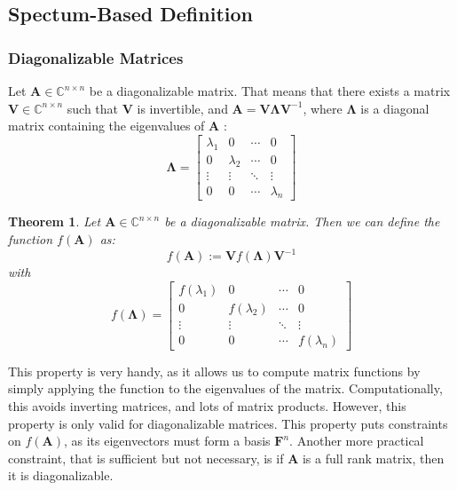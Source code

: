 \documentclass[12pt]{article}
\newtheorem{theorem}{Theorem}
\begin{document}
\subsection{Spectum-Based Definition}
\subsubsection*{Diagonalizable Matrices}
Let $\mathbf{A}\in\mathbb{C}^{n\times n}$ be a diagonalizable matrix. That means that there exists a matrix $\mathbf{V}\in\mathbb{C}^{n\times n}$ such that $\mathbf{V}$ is invertible, and $\mathbf{A} = \mathbf{V}\mathbf{\Lambda}\mathbf{V}^{-1}$, where $\mathbf{\Lambda}$ is a diagonal matrix containing the eigenvalues of $\mathbf{A}$ :
\begin{equation}
    \mathbf{\Lambda} = \begin{bmatrix}
        \lambda_1 & 0 & \cdots & 0 \\
        0 & \lambda_2 & \cdots & 0 \\
        \vdots & \vdots & \ddots & \vdots \\
        0 & 0 & \cdots & \lambda_n
    \end{bmatrix}
\end{equation}
\begin{theorem}
    Let $\mathbf{A}\in\mathbb{C}^{n\times n}$ be a diagonalizable matrix. Then we can define the function $f(\mathbf{A})$ as:
    \begin{equation}
        f(\mathbf{A}) := \mathbf{V}f(\mathbf{\Lambda})\mathbf{V}^{-1}
    \end{equation}
    with 
    \begin{equation}
        f(\mathbf{\Lambda}) = \begin{bmatrix}
            f(\lambda_1) & 0 & \cdots & 0 \\
            0 & f(\lambda_2) & \cdots & 0 \\
            \vdots & \vdots & \ddots & \vdots \\
            0 & 0 & \cdots & f(\lambda_n)
        \end{bmatrix}
    \end{equation}        
\end{theorem}
This property is very handy, as it allows us to compute matrix functions by simply applying the function to the eigenvalues of the matrix. Computationally, this avoids inverting matrices, and lots of matrix products. However, this property is only valid for diagonalizable matrices. This property puts constraints on $f(\mathbf{A})$, as its eigenvectors must form a basis $\mathbf{F}^n$. Another more practical constraint, that is sufficient but not necessary, is if $\mathbf{A}$ is a full rank matrix, then it is diagonalizable.
\end{document}
